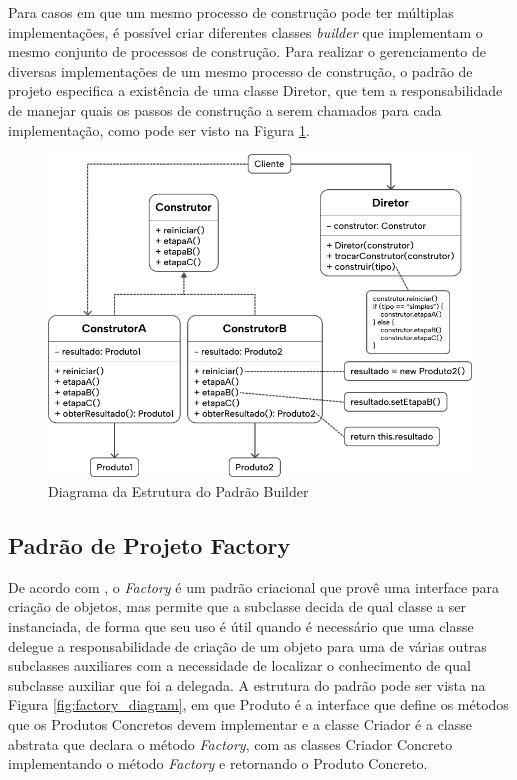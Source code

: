 \documentclass[12pt, %
openright, 
oneside, %
a4paper,    %
brazil]{facom-ufu-abntex2}
\begin{document}
Para casos em que um mesmo processo de construção pode ter múltiplas implementações, é possível criar diferentes classes \textit{builder} que implementam o mesmo conjunto de processos de construção. Para realizar o gerenciamento de diversas implementações de um mesmo processo de construção, o padrão de projeto especifica a existência de uma classe Diretor, que tem a responsabilidade de manejar quais os passos de construção a serem chamados para cada implementação, como pode ser visto na Figura \ref{fig:builder_diagram}.

\begin{figure}[ht]
    \centering
    \includegraphics[width=.65\textwidth]{figures/bibliographical_review/builder_diagram.png}
    \caption{Diagrama da Estrutura do Padrão Builder}
    \label{fig:builder_diagram}
\end{figure}

\subsection{Padrão de Projeto Factory}

De acordo com , o \textit{Factory} é um padrão criacional que provê uma interface para criação de objetos, mas permite que a subclasse decida de qual classe a ser instanciada, de forma que seu uso é útil quando é necessário que uma classe delegue a responsabilidade de criação de um objeto para uma de várias outras subclasses auxiliares com a necessidade de localizar o conhecimento de qual subclasse auxiliar que foi a delegada. A estrutura do padrão pode ser vista na Figura \ref{fig:factory_diagram}, em que Produto é a interface que define os métodos que os Produtos Concretos devem implementar e a classe Criador é a classe abstrata que declara o método \textit{Factory}, com as classes Criador Concreto implementando o método \textit{Factory} e retornando o Produto Concreto.
\end{document}
